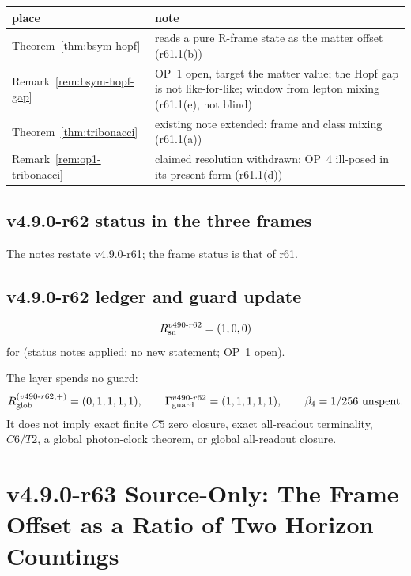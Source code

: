 \begin{center}
\small
\begin{tabular}{@{}>{\raggedright\arraybackslash}p{}>{\raggedright\arraybackslash}p{}@{}}
\toprule
place & note\\
\midrule
Theorem~\ref{thm:bsym-hopf} & reads a pure R-frame state as the matter offset (r61.1(b))\\
Remark~\ref{rem:bsym-hopf-gap} & OP~1 open, target the matter value; the Hopf gap is not like-for-like; window from lepton mixing (r61.1(e), not blind)\\
Theorem~\ref{thm:tribonacci} & existing note extended: frame and class mixing (r61.1(a))\\
Remark~\ref{rem:op1-tribonacci} & claimed resolution withdrawn; OP~4 ill-posed in its present form (r61.1(d))\\
\bottomrule
\end{tabular}
\end{center}

\subsection*{v4.9.0-r62 status in the three frames}
\label{subsec:v490-r62-frames}

The notes restate v4.9.0-r61; the frame status is that of r61.

\subsection*{v4.9.0-r62 ledger and guard update}
\label{subsec:v490-r62-ledger-guard}

\[
R_{\rm sn}^{v490\text{-}r62}=(1,0,0)
\]
for (status notes applied; no new statement; OP~1 open).

The layer spends no guard:
\[
R_{\rm glob}^{(v490\text{-}r62,+)}=(0,1,1,1,1),
\qquad
\Gamma_{\rm guard}^{v490\text{-}r62}=(1,1,1,1,1),
\qquad
\beta_4=1/256\ \text{unspent}.
\]
It does not imply exact finite \(C5\) zero closure, exact all-readout terminality,
\(C6/T2\), a global photon-clock theorem, or global all-readout closure.

\clearpage
\section*{v4.9.0-r63 Source-Only: The Frame Offset as a Ratio of Two Horizon Countings}
\label{sec:v490-r63-counting}


